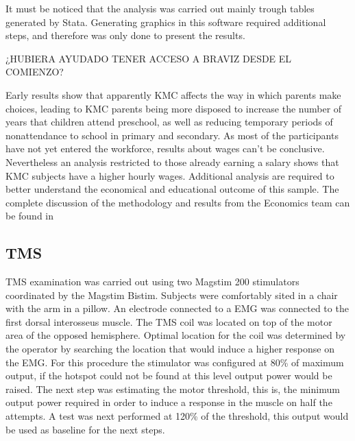 It must be noticed that the analysis was carried out mainly trough tables generated by Stata. Generating graphics in this software required additional steps, and therefore was only done to present the results.

¿HUBIERA AYUDADO TENER ACCESO A BRAVIZ DESDE EL COMIENZO?

Early results show that apparently KMC affects the way in which parents make choices, leading to KMC parents being more disposed to increase the number of years that children attend preschool, as well as reducing temporary periods of nonattendance to school in primary and secondary. As most of the participants have not yet entered the workforce, results about wages can't be conclusive. Nevertheless an analysis restricted to those already earning a salary shows that KMC subjects have a higher hourly wages. Additional analysis are required to better understand the economical and educational outcome of this sample.  The complete discussion of the methodology and results from the Economics team can be found in \autocite{?}
\subsection{TMS}

TMS examination was carried out using two Magstim 200 stimulators coordinated by the Magstim Bistim. Subjects were comfortably sited in a chair with the arm in a pillow. An electrode connected to a EMG was connected to the first dorsal interosseus muscle. The TMS coil was located on top of the motor area of the opposed hemisphere. Optimal location for the coil was determined by the operator by searching the location that would induce a higher response on the EMG. For this procedure the stimulator was configured at 80\% of maximum output, if the hotspot could not be found at this level output power would be raised. The next step was estimating the motor threshold, this is, the minimum output power required in order to induce a response in the muscle on half the attempts. A test was next performed at 120\% of the threshold, this output would be used as baseline for the next steps.


